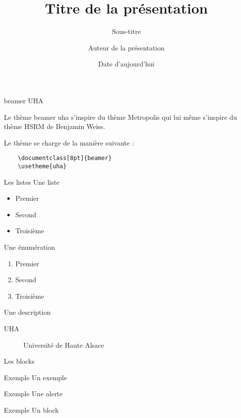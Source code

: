 \documentclass[8pt]{beamer}
\title{Titre de la présentation}
\subtitle{Sous-titre}
\date{Date d'aujourd'hui}
\author{Auteur de la présentation}
\institute{Université de Haute Alsace}
\begin{document}
\begin{frame}
	\titlepage
\end{frame}

\begin{frame}[fragile]{beamer UHA}
	
	Le thème beamer uha s'inspire du thème Metropolis qui lui même s'inspire du thème HSRM de Benjamin Weiss.

	Le thème se charge de la manière suivante :

	\begin{verbatim}
	\documentclass[8pt]{beamer}
	\usetheme{uha}
	\end{verbatim}
\end{frame}


\begin{frame}{Les listes}
	Une liste
	\begin{itemize}
		\item Premier
		\item Second
		\item Troisième
	\end{itemize}

	Une énumération
	\begin{enumerate}
		\item Premier
		\item Second
		\item Troisième
	\end{enumerate}

	Une description
	\begin{description}
		\item [UHA] Université de Haute Alsace
	\end{description}
\end{frame}

\begin{frame}{Les blocks}
	\begin{exampleblock}{Exemple}
		Un exemple
	\end{exampleblock}
	\begin{alertblock}{Exemple}
		Une alerte
	\end{alertblock}
	\begin{block}{Exemple}
		Un block
	\end{block}
\end{frame}
\end{document}
